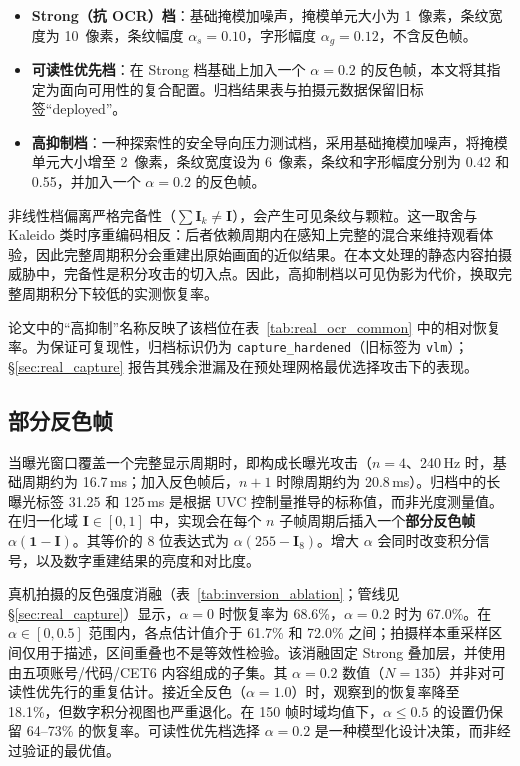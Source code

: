 \documentclass{ieeeaccess}
\begin{document}
\begin{itemize}
\item \textbf{Strong（抗 OCR）档}：基础掩模加噪声，掩模单元大小为 1~像素，条纹宽度为 10~像素，条纹幅度 $\alpha_s=0.10$，字形幅度 $\alpha_g=0.12$，不含反色帧。

\item \textbf{可读性优先档}：在 Strong 档基础上加入一个 $\alpha=0.2$ 的反色帧，本文将其指定为面向可用性的复合配置。归档结果表与拍摄元数据保留旧标签“deployed”。

\item \textbf{高抑制档}：一种探索性的安全导向压力测试档，采用基础掩模加噪声，将掩模单元大小增至 2~像素，条纹宽度设为 6~像素，条纹和字形幅度分别为 0.42 和 0.55，并加入一个 $\alpha=0.2$ 的反色帧。
\end{itemize}

非线性档偏离严格完备性（$\sum\mathbf{I}_k \neq \mathbf{I}$），会产生可见条纹与颗粒。这一取舍与 Kaleido 类时序重编码相反：后者依赖周期内在感知上完整的混合来维持观看体验，因此完整周期积分会重建出原始画面的近似结果。在本文处理的静态内容拍摄威胁中，完备性是积分攻击的切入点。因此，高抑制档以可见伪影为代价，换取完整周期积分下较低的实测恢复率。

论文中的“高抑制”名称反映了该档位在表~\ref{tab:real_ocr_common} 中的相对恢复率。为保证可复现性，归档标识仍为 \texttt{capture\_hardened}（旧标签为 \texttt{vlm}）；\S\ref{sec:real_capture} 报告其残余泄漏及在预处理网格最优选择攻击下的表现。

\subsection{部分反色帧}

当曝光窗口覆盖一个完整显示周期时，即构成长曝光攻击（$n=4$、240\,Hz 时，基础周期约为 16.7\,ms；加入反色帧后，$n+1$ 时隙周期约为 20.8\,ms）。归档中的长曝光标签 31.25 和 125\,ms 是根据 UVC 控制量推导的标称值，而非光度测量值。在归一化域 $\mathbf{I}\in[0,1]$ 中，实现会在每个 $n$ 子帧周期后插入一个\textbf{部分反色帧} $\alpha(\mathbf{1}-\mathbf{I})$。其等价的 8 位表达式为 $\alpha(255-\mathbf{I}_{8})$。增大 $\alpha$ 会同时改变积分信号，以及数字重建结果的亮度和对比度。

真机拍摄的反色强度消融（表~\ref{tab:inversion_ablation}；管线见 \S\ref{sec:real_capture}）显示，$\alpha=0$ 时恢复率为 68.6\%，$\alpha=0.2$ 时为 67.0\%。在 $\alpha\in[0,0.5]$ 范围内，各点估计值介于 61.7\% 和 72.0\% 之间；拍摄样本重采样区间仅用于描述，区间重叠也不是等效性检验。该消融固定 Strong 叠加层，并使用由五项账号/代码/CET6 内容组成的子集。其 $\alpha=0.2$ 数值（$N=135$）并非对可读性优先行的重复估计。接近全反色（$\alpha=1.0$）时，观察到的恢复率降至 18.1\%，但数字积分视图也严重退化。在 150 帧时域均值下，$\alpha\leq0.5$ 的设置仍保留 64--73\% 的恢复率。可读性优先档选择 $\alpha=0.2$ 是一种模型化设计决策，而非经过验证的最优值。
\end{document}
